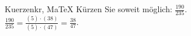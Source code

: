 \begin{MAufgabe}{Kuerzen}{kr, MaTeX}
K\"urzen Sie soweit m\"oglich: $\frac{190}{235}$.\\ 
\ifLsg\MLoesung
\quad $\frac{190}{235}=\frac{(5)\cdot(38)}{(5)\cdot(47)}=\frac{38}{47}$.\else\relax\fi
 \end{MAufgabe}